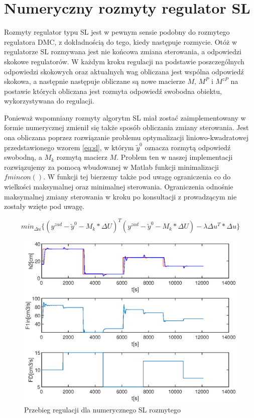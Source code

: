 \chapter{Numeryczny rozmyty regulator SL}
	Rozmyty regulator typu SL jest w pewnym sensie podobny do rozmytego regulatora DMC, z dokładnością do tego, kiedy następuje rozmycie. Otóż w regulatorze SL rozmywana jest nie końcowa zmiana sterowania, a odpowiedzi skokowe regulatorów. W każdym kroku regulacji na podstawie poszczególnych odpowiedzi skokowych oraz aktualnych wag obliczana jest wspólna odpowiedź skokowa, a następnie następuje obliczane są nowe macierze $M$, $M^P$ i $M^{zP}$ na postawie których obliczana jest rozmyta odpowiedź swobodna obiektu, wykorzystywana do regulacji.
	
	Ponieważ wspomniany rozmyty algorytm SL miał zostać zaimplementowany w formie numerycznej zmienił się także sposób obliczania zmiany sterowania. Jest ona obliczana poprzez rozwiązanie problemu optymalizacji liniowo-kwadratowej przedstawionego wzorem \ref{eq:sl}, w którym $\tilde{y}^0$ oznacza rozmytą odpowiedź swobodną, a $M_k$ rozmytą macierz $M$. Problem ten w naszej implementacji rozwiązujemy za pomocą wbudowanej w Matlab funkcji minimalizacji $fmincon()$. W funkcji tej bierzemy także pod uwagę ograniczenia co do wielkości maksymalnej oraz minimalnej sterowania. Ograniczenia odnośnie maksymalnej zmiany sterowania w kroku po konsultacji z prowadzącym nie zostały wzięte pod uwagę.
	
	
	\begin{equation}
		min_{\Delta u}\{(y^{zad}-\tilde{y}^0-M_k*\Delta U)^T(y^{zad}-\tilde{y}^0-M_k*\Delta U)-\lambda \Delta u^T*\Delta u\}
		\label{eq:sl}
	\end{equation}
	
	\begin{figure}[h!]
		\includegraphics[width=0.9\linewidth]{plots/z3_fdmc_sl.eps}
		\caption{Przebieg regulacji dla numerycznego SL rozmytego}
		\label{rys:sl}
	\end{figure}
	
